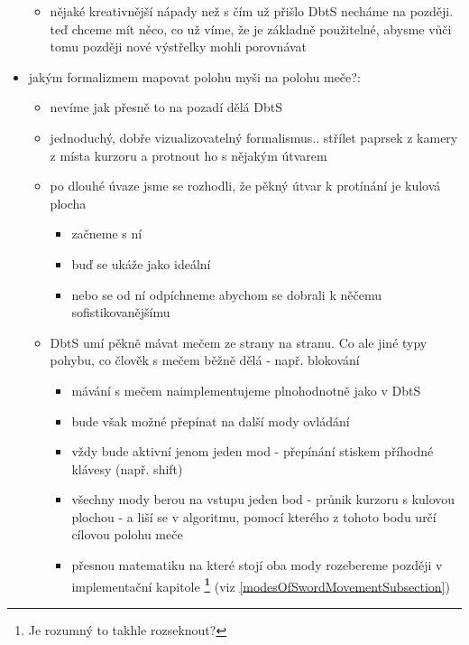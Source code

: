 \begin{itemize}
\begin{itemize}
            \item nějaké kreativnější nápady než s čím už přišlo DbtS necháme na později. teď chceme mít něco, co už víme, že je základně použitelné, abysme vůči tomu později nové výstřelky mohli porovnávat
        \end{itemize}
    \item jakým formalizmem mapovat polohu myši na polohu meče?:
        \begin{itemize}
            \item nevíme jak přesně to na pozadí dělá DbtS
            \item jednoduchý, dobře vizualizovatelný formalismus.. střílet paprsek z kamery z místa kurzoru a protnout ho s nějakým útvarem 
            \item po dlouhé úvaze jsme se rozhodli, že pěkný útvar k protínání je kulová plocha
                \begin{itemize}
                    \item začneme s ní
                    \item buď se ukáže jako ideální
                    \item nebo se od ní odpíchneme abychom se dobrali k něčemu sofistikovanějšímu
                \end{itemize}
            \item DbtS umí pěkně mávat mečem ze strany na stranu. Co ale jiné typy pohybu, co člověk s mečem běžně dělá - např. blokování
                \begin{itemize}
                    \item mávání s mečem naimplementujeme plnohodnotně jako v DbtS 
                    \item bude však možné přepínat na další mody ovládání
                    \item vždy bude aktivní jenom jeden mod - přepínání stiskem příhodné klávesy (např. shift)
                    \item všechny mody berou na vstupu jeden bod - průnik kurzoru s kulovou plochou - a liší se v algoritmu, pomocí kterého z tohoto bodu určí cílovou polohu meče
                    \item přesnou matematiku na které stojí oba mody rozebereme později v implementační kapitole \textbf{\footnote{Je rozumný to takhle rozseknout?}} (viz \ref{modesOfSwordMovementSubsection})
                \end{itemize}
        \end{itemize}
\end{itemize}

